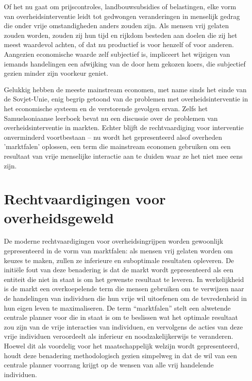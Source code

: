 Of het nu gaat om prijscontroles, landbouwsubsidies of belastingen, elke vorm van overheidsinterventie leidt tot gedwongen veranderingen in menselijk gedrag die onder vrije omstandigheden anders zouden zijn. Als mensen vrij gelaten zouden worden, zouden zij hun tijd en rijkdom besteden aan doelen die zij het meest waardevol achten, of dat nu productief is voor henzelf of voor anderen. Aangezien economische waarde zelf subjectief is, impliceert het wijzigen van iemands handelingen een afwijking van de door hem gekozen koers, die subjectief gezien minder zijn voorkeur geniet.

Gelukkig hebben de meeste mainstream economen, met name sinds het einde van de Sovjet-Unie, enig begrip getoond van de problemen met overheidsinterventie in het economische systeem en de verstorende gevolgen ervan. Zelfs het Samuelsoniaanse leerboek bevat nu een discussie over de problemen van overheidsinterventie in markten. Echter blijft de rechtvaardiging voor interventie onverminderd voortbestaan -- nu wordt het gepresenteerd alsof overheden 'marktfalen' oplossen, een term die mainstream economen gebruiken om een resultaat van vrije menselijke interactie aan te duiden waar ze het niet mee eens zijn.

\hypertarget{rechtvaardigingen-voor-overheidsgeweld}{%
\section{Rechtvaardigingen voor overheidsgeweld}\label{rechtvaardigingen-voor-overheidsgeweld}}

De moderne rechtvaardigingen voor overheidsingrijpen worden gewoonlijk gepresenteerd in de vorm van marktfalen: als mensen vrij gelaten worden om keuzes te maken, zullen ze inferieure en suboptimale resultaten opleveren. De initiële fout van deze benadering is dat de markt wordt gepresenteerd als een entiteit die niet in staat is om het gewenste resultaat te leveren. In werkelijkheid is de markt een overkoepelende term die mensen gebruiken om te verwijzen naar de handelingen van individuen die hun vrije wil uitoefenen om de tevredenheid in hun eigen leven te maximaliseren. De term ``marktfalen'' stelt een alwetende centrale planner voor die in staat is om te beslissen wat het optimale resultaat zou zijn van de vrije interacties van individuen, en vervolgens de acties van deze vrije individuen veroordeelt als inferieur en noodzakelijkerwijs te veranderen. Hoewel dit als voordelig voor het maatschappelijk welzijn wordt gepresenteerd, houdt deze benadering methodologisch gezien simpelweg in dat de wil van een centrale planner voorrang krijgt op de wensen van alle vrij handelende individuen.


